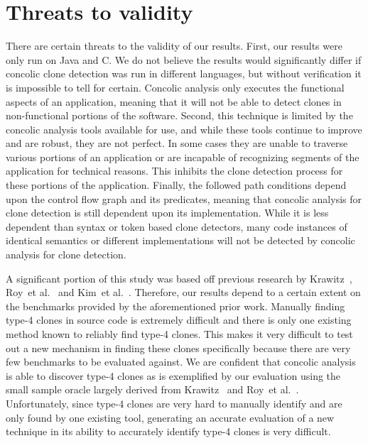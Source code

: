\documentclass[smallextended]{svjour3}       %
\begin{document}
\section{Threats to validity}
\label{sec: threats}


There are certain threats to the validity of our results. First, our results were only run on Java and C. We do not believe the results would significantly differ if concolic clone detection was run in different languages, but without verification it is impossible to tell for certain. Concolic analysis only executes the functional aspects of an application, meaning that it will not be able to detect clones in non-functional portions of the software. Second, this technique is limited by the concolic analysis tools available for use, and while these tools continue to improve and are robust, they are not perfect. In some cases they are unable to traverse various portions of an application or are incapable of recognizing segments of the application for technical reasons. This inhibits the clone detection process for these portions of the application. Finally, the followed path conditions depend upon the control flow graph and its predicates, meaning that concolic analysis for clone detection is still dependent upon its implementation. While it is less dependent than syntax or token based clone detectors, many code instances of identical semantics or different implementations will not be detected by concolic analysis for clone detection.

A significant portion of this study was based off previous research by Krawitz~\cite{Kraw2012}, Roy~et al.~\cite{Roy:2009:CEC:1530898.1531101} and Kim~et al.~\cite{Kim:2011:MMC:1985793.1985835}. Therefore, our results depend to a certain extent on the benchmarks provided by the aforementioned prior work. Manually finding type-4 clones in source code is extremely difficult and there is only one existing method known to reliably find type-4 clones. This makes it very difficult to test out a new mechanism in finding these clones specifically because there are very few benchmarks to be evaluated against. We are confident that concolic analysis is able to discover type-4 clones as is exemplified by our evaluation using the small sample oracle largely derived from Krawitz~\cite{Kraw2012} and Roy~et al.~\cite{Roy:2009:CEC:1530898.1531101}. Unfortunately, since type-4 clones are very hard to manually identify and are only found by one existing tool, generating an accurate evaluation of a new technique in its ability to accurately identify type-4 clones is very difficult.
\end{document}
